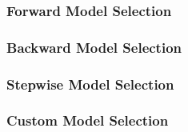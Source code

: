 \documentclass[american,]{article}
\begin{document}
\subsubsection{Forward Model Selection}\label{forward-model-selection}

\subsubsection{Backward Model Selection}\label{backward-model-selection}

\subsubsection{Stepwise Model Selection}\label{stepwise-model-selection}

\subsubsection{Custom Model Selection}\label{custom-model-selection}

\renewcommand\refname{References}

\end{document}
